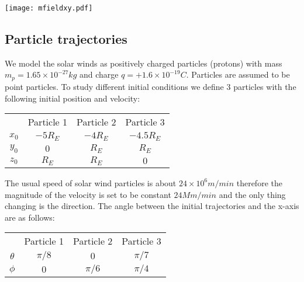 \documentclass[final,5p,times,twocolumn,authoryear]{elsarticle}
\begin{document}
\begin{center} \label{fig: mfieldxy}
\texttt{[image: mfieldxy.pdf]}
\end{center}

\subsection{Particle trajectories}
We model the solar winds as positively charged particles (protons) with mass $m_p =  1.65 \times 10^{-27} \si{kg} $ and charge $q = +1.6 \times 10^{-19}\si{C}$. Particles are assumed to be point particles. To study different initial conditions we define 3 particles with the following initial position and velocity:

\begin{table}[h]
\centering
\begin{tabular}{c|ccc}
    & Particle 1 & Particle 2 & Particle 3\\ \cline{1-4}
$x_0$ & $-5R_E$      & $-4R_E$       & $-4.5R_E$    \\
$y_0$ & $0$          & $R_E$        & $R_E$       \\
$z_0$ & $R_E$        & $R_E$       & $0$        
\end{tabular}
\end{table}

The usual speed of solar wind particles is about $24\times10^6 \si{m/min}$ therefore the magnitude of the velocity is set to be constant $24 \si{Mm/min}$ and the only thing changing is the direction. The angle between the initial trajectories and the x-axis are as follows: 
\begin{table}[h]
\centering
\begin{tabular}{c|ccc}
    & Particle 1 & Particle 2 & Particle 3\\ \cline{1-4}
$\theta$ & $\pi/8$      & $0$       & $\pi/7$    \\
$\phi$ & $0$          & $\pi/6$        & $\pi/4$       
\end{tabular}
\end{table}
\end{document}
